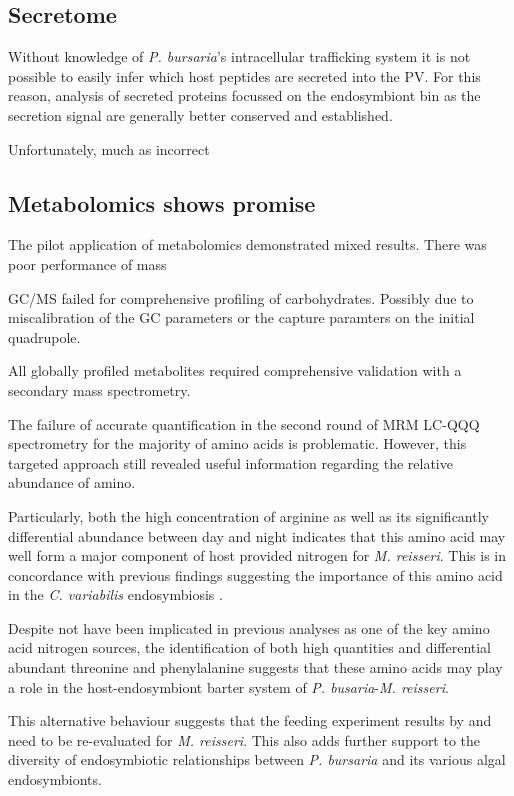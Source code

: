 \subsection{Secretome}
Without knowledge of \textit{P. bursaria}'s intracellular trafficking
system it is not possible to easily infer which host peptides are secreted into
the PV.  For this reason, analysis of secreted proteins focussed on 
the endosymbiont bin as the secretion signal are generally better conserved
and established. 

Unfortunately, much as incorrect




\subsection{Metabolomics shows promise}

The pilot application of metabolomics demonstrated mixed results.
There was poor performance of mass

GC/MS failed for comprehensive profiling of carbohydrates.
Possibly due to miscalibration of the GC parameters or the capture 
paramters on the initial quadrupole.


All globally profiled metabolites required comprehensive validation
with a secondary mass spectrometry. 


The failure of accurate quantification in the second round
of MRM LC-QQQ spectrometry for the majority of amino acids 
is problematic.  However, this targeted approach still revealed
useful information regarding the relative abundance of amino.



Particularly, both the high concentration of arginine as well
as its significantly differential abundance between day and night
indicates that this amino acid may well form a major component of 
host provided nitrogen for \textit{M. reisseri}. This is in
concordance with previous findings suggesting 
the importance of this amino acid in the \textit{C. variabilis}
endosymbiosis \citep{Kato2006}.

Despite not have been implicated in previous analyses
as one of the key amino acid nitrogen sources, the identification
of both high quantities and differential abundant 
threonine and phenylalanine suggests that these
amino acids may play a role in the host-endosymbiont
barter system of \textit{P. busaria}-\textit{M. reisseri}.




This alternative behaviour suggests that the feeding experiment
results by \citep{Kato2006} and \citep{Kato2009} need 
to be re-evaluated for \textit{M. reisseri}. This also
adds further support to the diversity of endosymbiotic
relationships between \textit{P. bursaria} and its
various algal endosymbionts. 


